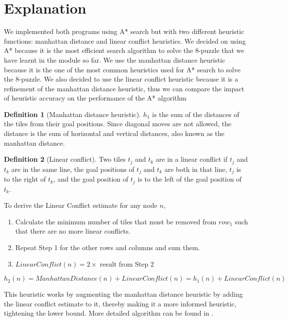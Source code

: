 \documentclass[10pt, a4paper]{article}
\theoremstyle{definition}
\newtheorem{definition}{Definition}
\begin{document}
\section{Explanation}
We implemented both programs using A* search but with two different heuristic functions: manhattan distance and linear conflict heuristics.
We decided on using A* because it is the most efficient search algorithm to solve the 8-puzzle that we have learnt in the module so far.
We use the manhattan distance heuristic because it is the one of the most common heuristics used for A* search to solve the 8-puzzle.
We also decided to use the linear conflict heuristic because it is a refinement of the manhattan distance heuristic, thus we can compare the impact of heuristic accuracy on the performance of the A* algorithm

\begin{definition}[Manhattan distance heuristic]
  $h_1$ is the sum of the distances of the tiles from their goal positions. Since diagonal moves are not allowed, the distance is the sum of horizontal and vertical distances, also known as the manhattan distance.
\end{definition}

\begin{definition}[Linear conflict]
  Two tiles $t_j$ and $t_k$ are in a linear conflict if $t_j$ and $t_k$ are in the same line, the goal positions of $t_j$ and $t_k$ are both in that line, $t_j$ is to the right of $t_k$, and the goal position of $t_j$ is to the left of the goal position of $t_k$.
\end{definition}

To derive the Linear Conflict estimate for any node $n$,
\begin{enumerate}
  \item Calculate the minimum number of tiles that must be removed from $row_1$ such that there are no more linear conflicts.
  \item Repeat Step 1 for the other rows and columns and sum them.
  \item $LinearConflict(n) = 2 \times $ result from Step 2
\end{enumerate}
\begin{equation*}
  h_2(n) = ManhattanDistance(n) + LinearConflict(n) = h_1(n) + LinearConflict(n)
\end{equation*}

This heuristic works by augmenting the manhattan distance heuristic by adding the linear conflict estimate to it, thereby making it a more informed heuristic, tightening the lower bound. More detailed algorithm can be found in .
\end{document}
